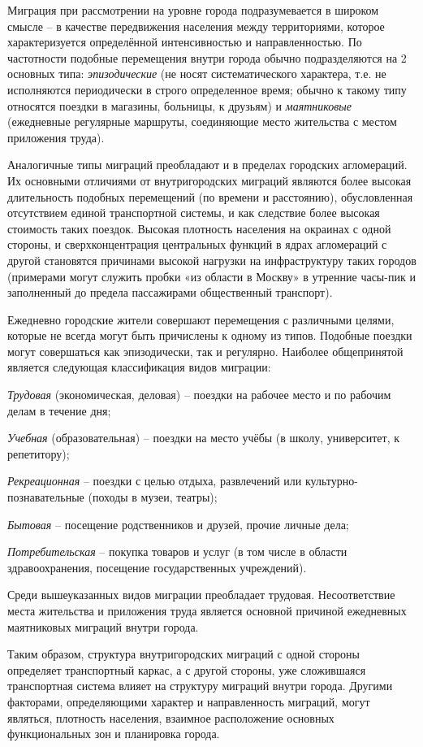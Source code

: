 \documentclass[
  11pt,
]{book}
\begin{document}
Миграция при рассмотрении на уровне города подразумевается в широком смысле -- в качестве передвижения населения между территориями, которое характеризуется определённой интенсивностью и направленностью. По частотности подобные перемещения внутри города обычно подразделяются на 2 основных типа: \emph{эпизодические} (не носят систематического характера, т.е. не исполняются периодически в строго определенное время; обычно к такому типу относятся поездки в магазины, больницы, к друзьям) и \emph{маятниковые} (ежедневные регулярные маршруты, соединяющие место жительства с местом приложения труда).

Аналогичные типы миграций преобладают и в пределах городских агломераций. Их основными отличиями от внутригородских миграций являются более высокая длительность подобных перемещений (по времени и расстоянию), обусловленная отсутствием единой транспортной системы, и как следствие более высокая стоимость таких поездок. Высокая плотность населения на окраинах с одной стороны, и сверхконцентрация центральных функций в ядрах агломераций с другой становятся причинами высокой нагрузки на инфраструктуру таких городов (примерами могут служить пробки «из области в Москву» в утренние часы-пик и заполненный до предела пассажирами общественный транспорт).

Ежедневно городские жители совершают перемещения с различными целями, которые не всегда могут быть причислены к одному из типов. Подобные поездки могут совершаться как эпизодически, так и регулярно. Наиболее общепринятой является следующая классификация видов миграции:

\emph{Трудовая} (экономическая, деловая) -- поездки на рабочее место и по рабочим делам в течение дня;

\emph{Учебная} (образовательная) -- поездки на место учёбы (в школу, университет, к репетитору);

\emph{Рекреационная} -- поездки с целью отдыха, развлечений или культурно-познавательные (походы в музеи, театры);

\emph{Бытовая} -- посещение родственников и друзей, прочие личные дела;

\emph{Потребительская} -- покупка товаров и услуг (в том числе в области здравоохранения, посещение государственных учреждений).

Среди вышеуказанных видов миграции преобладает трудовая. Несоответствие места жительства и приложения труда является основной причиной ежедневных маятниковых миграций внутри города.

Таким образом, структура внутригородских миграций с одной стороны определяет транспортный каркас, а с другой стороны, уже сложившаяся транспортная система влияет на структуру миграций внутри города. Другими факторами, определяющими характер и направленность миграций, могут являться, плотность населения, взаимное расположение основных функциональных зон и планировка города.
\end{document}
